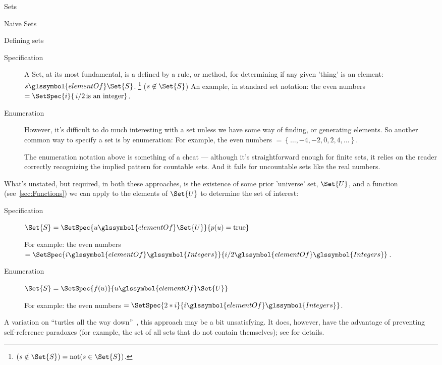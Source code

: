 \begin{plSection}{Sets}
\begin{plSection}{Naive Sets}
\begin{plSection}{Defining sets}
\begin{description}

\item[Specification]

A \gls{Set}, at its most fundamental, is a defined by a rule,
or method,
for determining if any given 'thing' is an element: 
$s \glssymbol{elementOf} \Set{S}$.
\footnote{$(s \notin \Set{S}) = \text{not}(s \in \Set{S})$.}
($s \not\in \Set{S}$)
An example, in standard set notation:
the even numbers 
$= \SetSpec{ i }{ \, i/2 \, \text{is an integer} }$.

\item[Enumeration]

However, it's difficult to do much interesting with a set
unless we have some way of finding, or generating elements.
So another common way to specify a set is by enumeration:
For example, the even numbers $= \left\{ \ldots, -4, -2, 0, 2 ,4,
\ldots \right\}$.

The enumeration notation above is something of a cheat ---
although it's straightforward enough for finite sets, it relies on
the reader correctly recognizing the implied pattern for countable
sets.
And it fails for uncountable sets like the real numbers.

\end{description}

What's unstated, but required, in both these approaches, is the
existence of some prior 'universe' set, $\Set{U}$, and a function
(see~\cref{sec:Functions}) we can apply to the elements of
$\Set{U}$ to determine the set of interest:

\begin{description}
\item[Specification] 
$\Set{S} =
\SetSpec{ u \glssymbol{elementOf} \Set{U} }{ p(u) = \text{true} }$ 

For example: the even numbers
 $= \SetSpec{ i \glssymbol{elementOf} 
\glssymbol{Integers} }{
 i/2 \glssymbol{elementOf} \glssymbol{Integers} }$.

\item[Enumeration]
$\Set{S} =
\SetSpec{ f(u) }{ u \glssymbol{elementOf} \Set{U} }$ 

For example: the even numbers 
$= \SetSpec{ 2*i }{ i \glssymbol{elementOf} \glssymbol{Integers} }$.

\end{description}
A variation on 
``turtles all the way down''~\cite{Munroe:2014:XKCDTurtles, wiki:Turtles},
this approach may be a bit unsatisfying.
It does, however, have the advantage of preventing self-reference
paradoxes (for example, 
the set of all sets that do not contain themselves); 
see 
for details.


\end{plSection}
\end{plSection}
\end{plSection}

